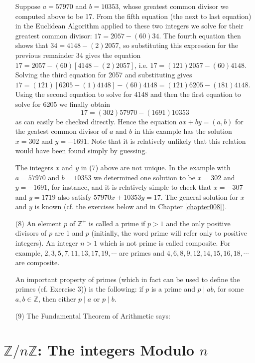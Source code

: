 \documentclass[cn,11pt,chinese]{elegantbook}
\numberwithin{equation}{section}
\begin{document}
\begin{enumerate}
\begin{example}
Suppose $a = 57970$ and $b=10353$, whose greatest common divisor we computed above to be 17. From the fifth equation (the next to last equation) in the Euclidean Algorithm applied to these two integers we solve for their greatest common divisor: $17 = 2057 - (60)34$. The fourth equation then shows that $34 = 4148 - (2)2057$, so substituting this expression for the previous remainder 34 gives the equation $17 = 2057 - (60)[4148 - (2)2057]$, i.e. $17 = (121)2057 - (60)4148$. Solving the third equation for 2057 and substituting gives $17 = (121)[6205 - (1)4148] - (60)4148 = (121)6205 - (181)4148$. Using the second equation to solve for 4148 and then the first equation to solve for 6205 we finally obtain
\[
17 = (302)57970 - (1691)10353
\]
as can easily be checked directly. Hence the equation $ax + by = (a, b)$ for the geatest common divisor of $a$ and $b$ in this example has the solution $x = 302$ and $y=-1691$. Note that it is relatively unlikely that this relation would have been found simply by guessing.
\end{example}

The integers $x$ and $y$ in (7) above are not unique. In the example with $a = 57970$ and $b = 10353$ we determined one solution to be $x = 302$ and $y = -1691$, for instance, and it is relatively simple to check that $x = -307$ and $y = 1719$ also satisfy $57970x + 10353y=17$. The general solution for $x$ and $y$ is known (cf. the exercises below and in Chapter \ref{chapter008}).

\item[(8)] An element $p$ of $\mathbb{Z}^+$ is called a prime if $p > 1$ and the only positive divisors of $p$ are 1 and $p$ (initially, the word prime will refer only to positive integers). An integer $n > 1$ which is not prime is called composite. For example, $2,3,5,7,11,13,17,19, \cdots$ are primes and $4,6,8,9,12,14,15,16,18, \cdots$ are composite.

An important property of primes (which in fact can be used to define the primes (cf. Exercise 3)) is the following: if $p$ is a prime and $p \mid ab$, for some $a, b \in \mathbb{Z}$, then either $p \mid a$ or $p \mid b$.

\item[(9)] The Fundamental Theorem of Arithmetic says:
\end{enumerate}


\section{$\mathbb{Z}/n\mathbb{Z}$: The integers Modulo $n$}\label{section00003}
\end{document}
